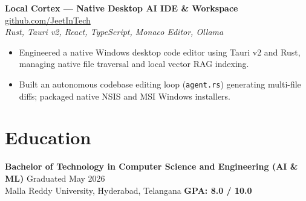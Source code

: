 \documentclass[10pt]{article}
\newcommand{\educationSection}{
\section*{Education}
\textbf{Bachelor of Technology in Computer Science and Engineering (AI \& ML)} \hfill Graduated May 2026 \\
Malla Reddy University, Hyderabad, Telangana \hfill \textbf{GPA: 8.0 / 10.0}
}
\begin{document}
\vspace{1.5pt}
\textbf{Local Cortex — Native Desktop AI IDE \& Workspace} \hfill \href{https://github.com/JeetInTech/Local-Cortex-your-local-chatgpt-with-built-in-editor}{github.com/JeetInTech} \\
\textit{Rust, Tauri v2, React, TypeScript, Monaco Editor, Ollama}
\begin{itemize}
    \item Engineered a native Windows desktop code editor using Tauri v2 and Rust, managing native file traversal and local vector RAG indexing.
    \item Built an autonomous codebase editing loop (\texttt{agent.rs}) generating multi-file diffs; packaged native NSIS and MSI Windows installers.
\end{itemize}

\educationSection
\end{document}
